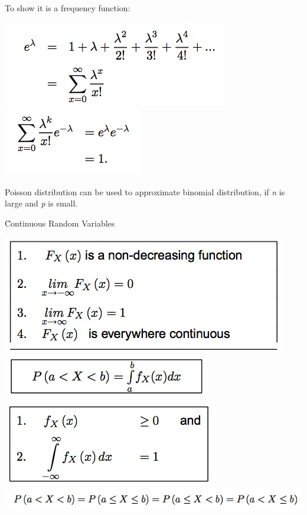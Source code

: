 \documentclass{/out/app/latex/examnotes}
\begin{document}
{
\vspace{6pt}

\disobeylines
{} %

\obeylines


To show it is a frequency function: 

\includegraphics[scale=0.7]{./img/2poi1.jpg}
\includegraphics[scale=0.7]{./img/2poi2.jpg}

Poisson distribution can be used to approximate binomial distribution, if \emph{n} is large and \emph{p} is small.


\h{Continuous Random Variables}

\includegraphics[scale=0.7]{./img/2con1.jpg}
\includegraphics[scale=0.7]{./img/2con2.jpg}
\includegraphics[scale=0.7]{./img/2con3.jpg}
\includegraphics[scale=0.7]{./img/2con4.jpg}


}
\end{document}
